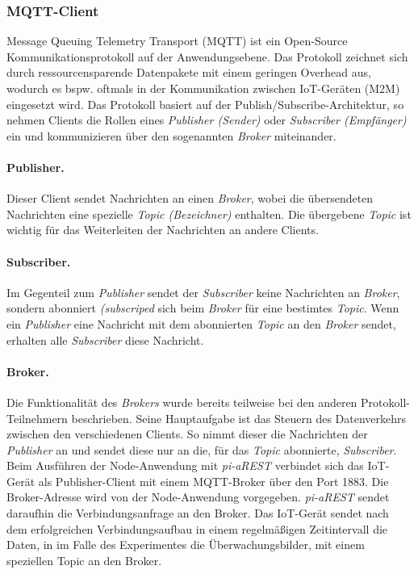 \pagebreak

\subsubsection{MQTT-Client}
Message Queuing Telemetry Transport (MQTT) ist ein Open-Source Kommunikationsprotokoll auf der
Anwendungsebene. Das Protokoll zeichnet sich durch ressourcensparende Datenpakete mit einem 
geringen Overhead aus, wodurch es bspw. oftmals in der Kommunikation zwischen IoT-Geräten (M2M) 
eingesetzt wird. Das Protokoll basiert auf der Publish/Subscribe-Architektur, so nehmen Clients
die Rollen eines \textit{Publisher (Sender)} oder \textit{Subscriber (Empfänger)} ein und kommunizieren
über den sogenannten \textit{Broker} miteinander. \cite{mqtt, wong20man}

\paragraph{Publisher.} 
Dieser Client sendet Nachrichten an einen \textit{Broker}, wobei die übersendeten Nachrichten eine spezielle
\textit{Topic (Bezeichner)} enthalten. Die übergebene \textit{Topic} ist wichtig für das Weiterleiten der
Nachrichten an andere Clients. \cite{mqtt, wong20man}


\paragraph{Subscriber.} 
Im Gegenteil zum \textit{Publisher} sendet der \textit{Subscriber} keine Nachrichten an \textit{Broker},
sondern abonniert \textit{(subscriped} sich beim \textit{Broker} für eine bestimtes \textit{Topic}. 
Wenn ein \textit{Publisher} eine Nachricht mit dem abonnierten \textit{Topic} an den \textit{Broker}
sendet, erhalten alle \textit{Subscriber} diese Nachricht. \cite{mqtt, wong20man}


\paragraph{Broker.} 
Die Funktionalität des \textit{Brokers} wurde bereits teilweise bei den anderen Protokoll-Teilnehmern 
beschrieben. Seine Hauptaufgabe ist das Steuern des Datenverkehrs zwischen den verschiedenen Clients.
So nimmt dieser die Nachrichten der \textit{Publisher} an und sendet diese nur an die, für das \textit{Topic} 
abonnierte, \textit{Subscriber}. \cite{mqtt, wong20man} \\


Beim Ausführen der Node-Anwendung mit \textit{pi-aREST} verbindet sich das IoT-Gerät als Publisher-Client
mit einem MQTT-Broker über den Port 1883. Die Broker-Adresse wird von der Node-Anwendung vorgegeben.
\textit{pi-aREST} sendet daraufhin die Verbindungsanfrage an den Broker. Das IoT-Gerät sendet nach dem 
erfolgreichen Verbindungsaufbau in einem regelmäßigen Zeitintervall die Daten, in im Falle des Experimentes
die Überwachungsbilder, mit einem speziellen Topic an den Broker. \cite{piarestgtihub} \\

